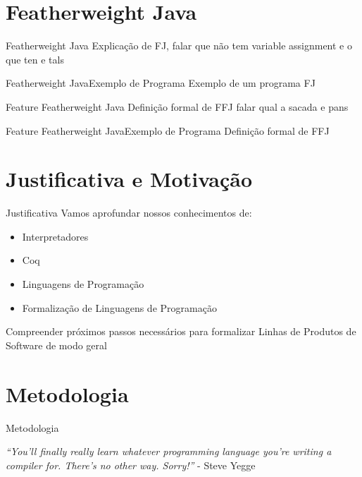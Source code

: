\documentclass{beamer}
\begin{document}
	\section{Featherweight Java}
	\begin{frame}{Featherweight Java}
		\centering
		Explicação de FJ, falar que não tem variable assignment e o que ten e tals
	\end{frame}
	\begin{frame}{Featherweight Java}{Exemplo de Programa}
		\centering
		Exemplo de um programa FJ
	\end{frame}
	\begin{frame}{Feature Featherweight Java}
		\centering
		Definição formal de FFJ falar qual a sacada e pans
	\end{frame}
	\begin{frame}{Feature Featherweight Java}{Exemplo de Programa}
		\centering
		Definição formal de FFJ
	\end{frame}
	

	
	\section{Justificativa e Motivação}
	
	
	\begin{frame}{Justificativa}
		Vamos aprofundar nossos conhecimentos de:
		\begin{itemize}
			\item Interpretadores
			\item Coq
			\item Linguagens de Programação
			\item Formalização de Linguagens de Programação
		\end{itemize}    
		\begin{block}{}
			Compreender próximos passos necessários para formalizar Linhas de Produtos de Software de modo geral
		\end{block}
	\end{frame}

	
	\section{Metodologia}
	\begin{frame}{Metodologia}
		\centering
		\begin{block}{}
		\textit{``You'll finally really learn whatever programming language you're writing a compiler for. There's no other way. Sorry!''} -  Steve Yegge
	\end{block}
	\end{frame}
	
\end{document}
